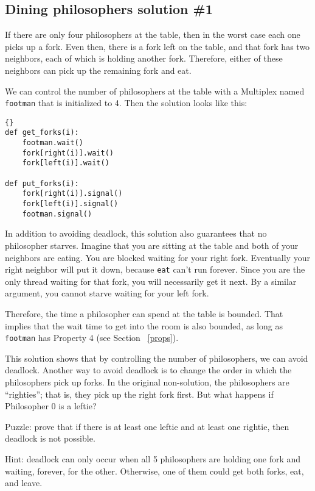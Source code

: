 \documentclass{book}
\newcommand{\clearemptydoublepage}{\newpage\cleardoublepage}
\begin{document}
\clearemptydoublepage
\subsection{Dining philosophers solution \#1}

If there are only four philosophers at the table, then in the
worst case each one picks up a fork.  Even then, there is a fork
left on the table, and that fork has two neighbors, each of
which is holding another fork.  Therefore, either of these
neighbors can pick up the remaining fork and eat.

We can control the number of philosophers at the table with
a Multiplex named {\tt footman} that is initialized to 4.
Then the solution looks like this:

\begin{lstlisting}[title={Dining philosophers solution \#1}]{}
def get_forks(i):
    footman.wait()
    fork[right(i)].wait()
    fork[left(i)].wait()

def put_forks(i):
    fork[right(i)].signal()
    fork[left(i)].signal()
    footman.signal()
\end{lstlisting}

In addition to avoiding deadlock, this solution also guarantees that
no philosopher starves.
Imagine that you
are sitting at the table and both of your neighbors are eating.  You
are blocked waiting for your right fork.  Eventually your right
neighbor will put it down, because {\tt eat} can't run forever.  Since
you are the only thread waiting for that fork, you will necessarily
get it next.  By a similar argument, you cannot starve waiting for
your left fork.

Therefore, the time a philosopher can spend at the table is bounded.
That implies that the wait time to get into the room is also bounded,
as long as {\tt footman} has Property 4 (see Section ~\ref{props}).

This solution shows that
by controlling the number of philosophers, we can avoid deadlock.
Another way to avoid deadlock is to change the order in which the
philosophers pick up forks.  In the original non-solution, the
philosophers are ``righties''; that is, they pick up the right fork
first.  But what happens if Philosopher 0 is a leftie?

Puzzle: prove that if there is at least one leftie and at least one
rightie, then deadlock is not possible.

Hint: deadlock can only occur when all 5 philosophers are holding
one fork and waiting, forever, for the other.  Otherwise, one of
them could get both forks, eat, and leave.
\end{document}
